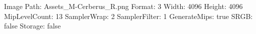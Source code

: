 Image Path: Assets\Meshes\Cerberus\Cerberus_M-Cerberus_R.png
Format: 3
Width: 4096
Height: 4096
MipLevelCount: 13
SamplerWrap: 2
SamplerFilter: 1
GenerateMips: true
SRGB: false
Storage: false